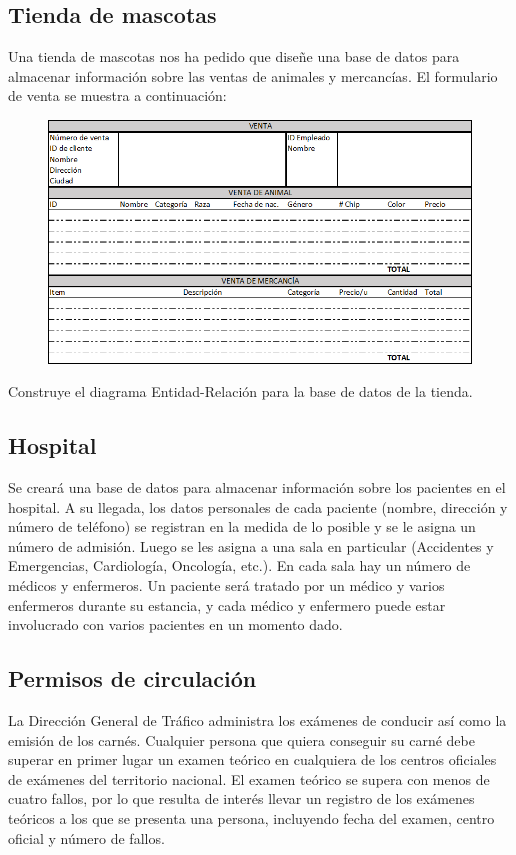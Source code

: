 \documentclass{db-practice}
\begin{document}
\subsection{Tienda de mascotas}
Una tienda de mascotas nos ha pedido que diseñe una base de datos para almacenar información sobre las ventas de animales y mercancías. El formulario de venta se muestra a continuación:

\begin{figure}[h]
    \centering
    \includegraphics[width=\textwidth]{figs/mascotas}
\end{figure}

Construye el diagrama Entidad-Relación para la base de datos de la tienda.

\subsection{Hospital}
Se creará una base de datos para almacenar información sobre los pacientes en el hospital. A su llegada, los datos personales de cada paciente (nombre, dirección y número de teléfono) se registran en la medida de lo posible y se le asigna un número de admisión. Luego se les asigna a una sala en particular (Accidentes y Emergencias, Cardiología, Oncología, etc.). En cada sala hay un número de médicos y enfermeros. Un paciente será tratado por un médico y varios enfermeros durante su estancia, y cada médico y enfermero puede estar involucrado con varios pacientes en un momento dado.

\subsection{Permisos de circulación}
La Dirección General de Tráfico administra los exámenes de conducir así como la emisión de los carnés. Cualquier persona que quiera conseguir su carné debe superar en primer lugar un examen teórico en cualquiera de los centros oficiales de exámenes del territorio nacional. El examen teórico se supera con menos de cuatro fallos, por lo que resulta de interés llevar un registro de los exámenes teóricos a los que se presenta una persona, incluyendo fecha del examen, centro oficial y número de fallos.
\end{document}
